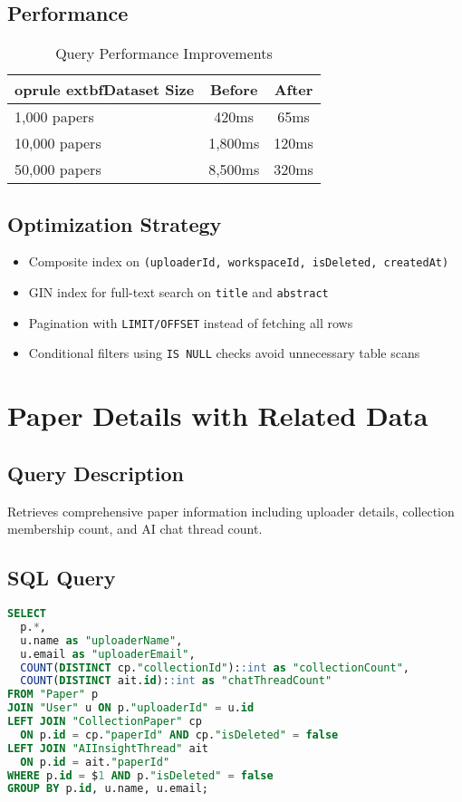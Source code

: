 \subsection{Performance}
\begin{table}[H]
\centering
\begin{tabular}{@{}lcc@{}}
	oprule
	extbf{Dataset Size} & \textbf{Before} & \textbf{After} \\
\midrule
1,000 papers & 420ms & 65ms \\
10,000 papers & 1,800ms & 120ms \\
50,000 papers & 8,500ms & 320ms \\
\bottomrule
\end{tabular}
\caption{Query Performance Improvements}
\label{tab:query-performance}
\end{table}

\subsection{Optimization Strategy}
\begin{itemize}[leftmargin=*,topsep=3pt,itemsep=2pt]
    \item Composite index on \texttt{(uploaderId, workspaceId, isDeleted, createdAt)}
    \item GIN index for full-text search on \texttt{title} and \texttt{abstract}
    \item Pagination with \texttt{LIMIT/OFFSET} instead of fetching all rows
    \item Conditional filters using \texttt{IS NULL} checks avoid unnecessary table scans
\end{itemize}

\section{Paper Details with Related Data}
\label{sec:query-paper-details}

\subsection{Query Description}
Retrieves comprehensive paper information including uploader details, collection membership count, and AI chat thread count.

\subsection{SQL Query}
\begin{lstlisting}[language=SQL, caption={Paper Details with Aggregated Statistics}]
SELECT 
  p.*, 
  u.name as "uploaderName", 
  u.email as "uploaderEmail",
  COUNT(DISTINCT cp."collectionId")::int as "collectionCount",
  COUNT(DISTINCT ait.id)::int as "chatThreadCount"
FROM "Paper" p
JOIN "User" u ON p."uploaderId" = u.id
LEFT JOIN "CollectionPaper" cp 
  ON p.id = cp."paperId" AND cp."isDeleted" = false
LEFT JOIN "AIInsightThread" ait 
  ON p.id = ait."paperId"
WHERE p.id = $1 AND p."isDeleted" = false
GROUP BY p.id, u.name, u.email;
\end{lstlisting}

